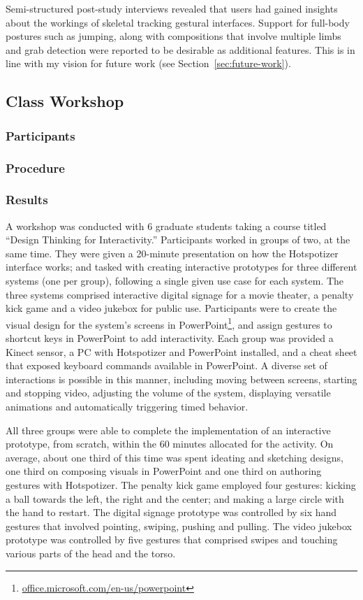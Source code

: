 Semi-structured post-study interviews revealed that users had gained insights about the workings of skeletal tracking gestural interfaces. Support for full-body postures such as jumping, along with compositions that involve multiple limbs and grab detection were reported to be desirable as additional features. This is in line with my vision for future work (see Section~\ref{sec:future-work}).

\subsection{Class Workshop}

\subsubsection{Participants}

\subsubsection{Procedure}

\subsubsection{Results}

A workshop was conducted with 6 graduate students taking a course titled “Design Thinking for Interactivity.” Participants worked in groups of two, at the same time. They were given a 20-minute presentation on how the Hotspotizer interface works; and tasked with creating interactive prototypes for three different systems (one per group), following a single given use case for each system. The three systems comprised interactive digital signage for a movie theater, a penalty kick game and a video jukebox for public use. Participants were to create the visual design for the system’s screens in PowerPoint\footnote{\href{http://office.microsoft.com/en-us/powerpoint/}{office.microsoft.com/en-us/powerpoint}}, and assign gestures to shortcut keys in PowerPoint to add interactivity. Each group was provided a Kinect sensor, a PC with Hotspotizer and PowerPoint installed, and a cheat sheet that exposed keyboard commands available in PowerPoint. A diverse set of interactions is possible in this manner, including moving between screens, starting and stopping video, adjusting the volume of the system, displaying versatile animations and automatically triggering timed behavior.

All three groups were able to complete the implementation of an interactive prototype, from scratch, within the 60 minutes allocated for the activity. On average, about one third of this time was spent ideating and sketching designs, one third on composing visuals in PowerPoint and one third on authoring gestures with Hotspotizer. The penalty kick game employed four gestures: kicking a ball towards the left, the right and the center; and making a large circle with the hand to restart. The digital signage prototype was controlled by six hand gestures that involved pointing, swiping, pushing and pulling. The video jukebox prototype was controlled by five gestures that comprised swipes and touching various parts of the head and the torso.

